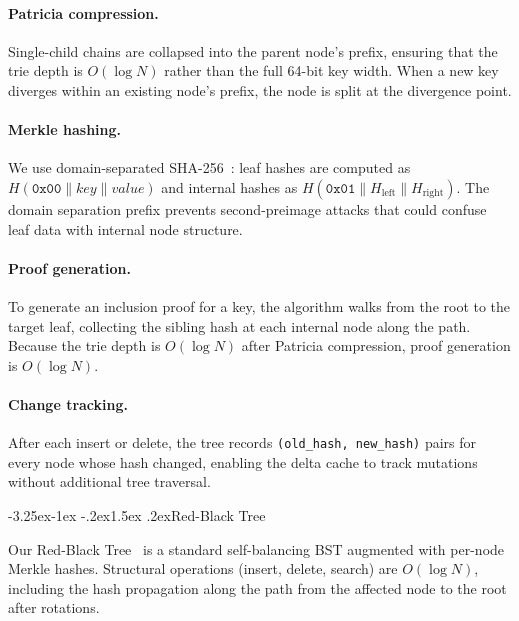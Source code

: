 \documentclass[letterpaper,twocolumn,10pt]{article}
\makeatletter
\renewcommand{\subsection}{\@startsection{subsection}{2}{\z@}%
  {-3.25ex\@plus -1ex \@minus -.2ex}{1.5ex \@plus .2ex}{\normalfont\normalsize\bfseries}}
\makeatother
\begin{document}
\paragraph{Patricia compression.}
Single-child chains are collapsed into the parent node's prefix, ensuring that the trie depth is $O(\log N)$ rather than the full 64-bit key width.
When a new key diverges within an existing node's prefix, the node is split at the divergence point.

\paragraph{Merkle hashing.}
We use domain-separated SHA-256~\cite{merkle1988digital}: leaf hashes are computed as $H(\texttt{0x00} \| \mathit{key} \| \mathit{value})$ and internal hashes as $H(\texttt{0x01} \| H_{\mathrm{left}} \| H_{\mathrm{right}})$.
The domain separation prefix prevents second-preimage attacks that could confuse leaf data with internal node structure.

\paragraph{Proof generation.}
To generate an inclusion proof for a key, the algorithm walks from the root to the target leaf, collecting the sibling hash at each internal node along the path.
Because the trie depth is $O(\log N)$ after Patricia compression, proof generation is $O(\log N)$.

\paragraph{Change tracking.}
After each insert or delete, the tree records \texttt{(old\_hash, new\_hash)} pairs for every node whose hash changed, enabling the delta cache to track mutations without additional tree traversal.

\subsection{Red-Black Tree}

Our Red-Black Tree~\cite{cormen2009introduction} is a standard self-balancing BST augmented with per-node Merkle hashes.
Structural operations (insert, delete, search) are $O(\log N)$, including the hash propagation along the path from the affected node to the root after rotations.
\end{document}
